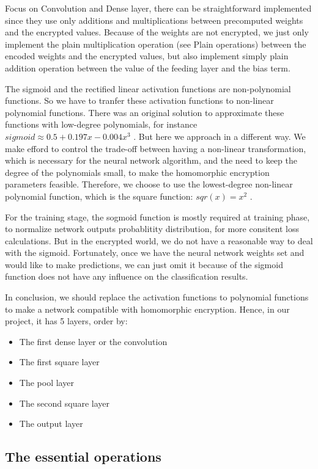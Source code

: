 \documentclass[A4paper,12pt]{article}
\begin{document}
Focus on Convolution and Dense layer, there can be straightforward implemented since they use only additions and multiplications between precomputed weights and the encrypted values. Because of the weights are not encrypted, we just only implement the plain multiplication operation (see Plain operations) between the encoded weights and the encrypted values, but also implement simply plain addition operation between the value of the feeding layer and the bias term.

The sigmoid and the rectified linear activation functions are non-polynomial functions. So we have to tranfer these activation functions to non-linear polynomial functions. There was an original solution to approximate these functions with low-degree polynomials, for instance $sigmoid \approx 0.5 + 0.197x - 0.004x^3$ \cite{appro_sigmoid}. But here we approach in a different way. We make efford to control the trade-off between having a non-linear transformation, which is necessary for the neural network algorithm, and the need to keep the degree of the polynomials small, to make the homomorphic encryption parameters feasible. Therefore, we choose to use the lowest-degree non-linear polynomial function, which is the square function: $sqr(x) = x^2$ \cite{replace_relu} \cite{replace_activate}.

For the training stage, the sogmoid function is mostly required at training phase, to normalize network outputs probablitity distribution, for more consitent loss calculations. But in the encrypted world, we do not have a reasonable way to deal with the sigmoid. Fortunately, once we have the neural network weights set and would like to make predictions, we can just omit it because of the sigmoid function does not have any influence on the classification results.

In conclusion, we should replace the activation functions to polynomial functions to make a network compatible with homomorphic encryption. Hence, in our project, it has 5 layers, order by:
\begin{itemize}
	\item The first dense layer or the convolution
	\item The first square layer
	\item The pool layer
	\item The second square layer
	\item The output layer
\end{itemize}

	\subsection{The essential operations}
	
\end{document}
